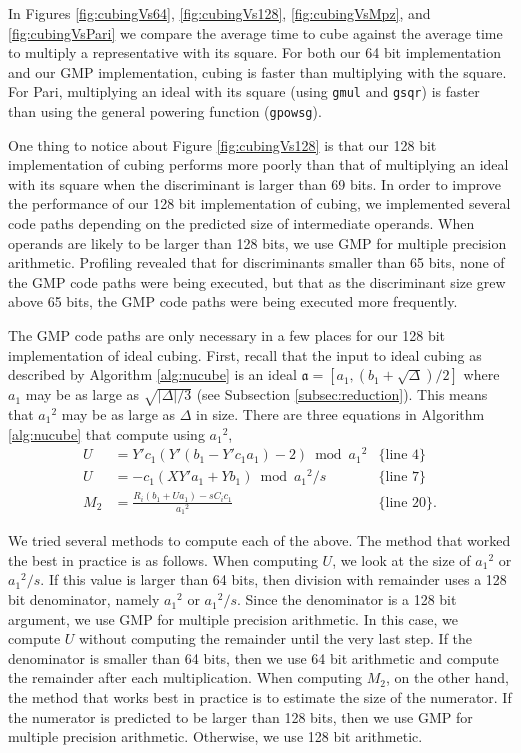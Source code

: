 \documentclass{ucalgthes1}
\theoremstyle{definition}
\newcommand{\ideal}{\mathfrak}
\begin{document}

In Figures \ref{fig:cubingVs64}, \ref{fig:cubingVs128}, \ref{fig:cubingVsMpz}, and \ref{fig:cubingVsPari} we compare the average time to cube against the average time to multiply a representative with its square.  For both our 64 bit implementation and our GMP implementation, cubing is faster than multiplying with the square.  For Pari, multiplying an ideal with its square (using \texttt{gmul} and \texttt{gsqr}) is faster than using the general powering function (\texttt{gpowsg}).
 
One thing to notice about Figure \ref{fig:cubingVs128} is that our 128 bit implementation of cubing performs more poorly than that of multiplying an ideal with its square when the discriminant is larger than 69 bits.  In order to improve the performance of our 128 bit implementation of cubing, we implemented several code paths depending on the predicted size of intermediate operands.  When operands are likely to be larger than 128 bits, we use GMP for multiple precision arithmetic.  Profiling revealed that for discriminants smaller than 65 bits, none of the GMP code paths were being executed, but that as the discriminant size grew above 65 bits, the GMP code paths were being executed more frequently.

The GMP code paths are only necessary in a few places for our 128 bit implementation of ideal cubing.  First, recall that the input to ideal cubing as described by Algorithm \ref{alg:nucube} is an ideal $\ideal a = [a_1, (b_1 + \sqrt \Delta)/2]$ where $a_1$ may be as large as $\sqrt{|\Delta|/3}$ (see Subsection \ref{subsec:reduction}).  This means that ${a_1}^2$ may be as large as $\Delta$ in size.  There are three equations in Algorithm \ref{alg:nucube} that compute using ${a_1}^2$,  
\begin{align*}
U &= Y'c_1(Y'(b_1 - Y'c_1a_1) - 2) \bmod {a_1}^2 & \textrm{\{line 4\}}\\
U &= -c_1(XY'a_1+Yb_1) \bmod {a_1}^2/s & \textrm{\{line 7\}} \\
M_2 &= \frac{R_i(b_1 + Ua_1) - sC_ic_1}{{a_1}^2} & \textrm{\{line 20\}}.
\end{align*}

We tried several methods to compute each of the above.  The method that worked the best in practice is as follows.  When computing $U$, we look at the size of ${a_1}^2$ or ${a_1}^2/s$.  If this value is larger than 64 bits, then division with remainder uses a 128 bit denominator, namely ${a_1}^2$ or ${a_1}^2/s$.  Since the denominator is a 128 bit argument, we use GMP for multiple precision arithmetic.  In this case, we compute $U$ without computing the remainder until the very last step.  If the denominator is smaller than 64 bits, then we use 64 bit arithmetic and compute the remainder after each multiplication.  When computing $M_2$, on the other hand, the method that works best in practice is to estimate the size of the numerator.  If the numerator is predicted to be larger than 128 bits, then we use GMP for multiple precision arithmetic.  Otherwise, we use 128 bit arithmetic.
\end{document}
